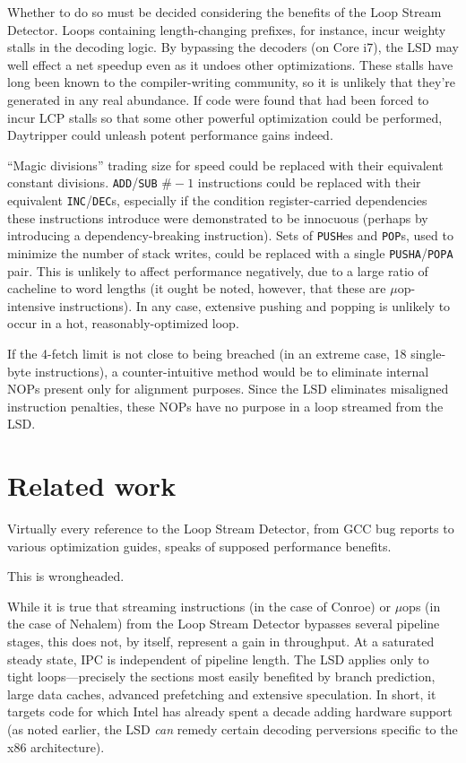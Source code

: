 \documentclass[]{sigplanconf}
\begin{document}
Whether to do so must be decided considering the benefits of the Loop Stream
Detector. Loops containing length-changing prefixes, for instance, incur weighty
stalls in the decoding logic. By bypassing the decoders (on Core\texttrademark
i7), the LSD may well effect a net speedup even as it undoes other optimizations.
These stalls have long been known to the compiler-writing community, so it is
unlikely that they're generated in any real abundance. If code were found that
had been forced to incur LCP stalls so that some other powerful optimization
could be performed, Daytripper could unleash potent performance gains indeed.

``Magic divisions'' trading size for speed \cite{knuth2} could be replaced
with their equivalent constant divisions. \texttt{ADD}/\texttt{SUB} $\#-1$ instructions
could be replaced with their equivalent \texttt{INC}/\texttt{DEC}s, especially
if the condition register-carried dependencies these instructions introduce
were demonstrated to be innocuous (perhaps by introducing a dependency-breaking
instruction). Sets of \texttt{PUSH}es and \texttt{POP}s, used
to minimize the number of stack writes, could be replaced with a single
\texttt{PUSHA}/\texttt{POPA} pair. This is unlikely to affect performance negatively,
due to a large ratio of cacheline to word lengths (it ought be noted, however,
that these are $\mu$op-intensive instructions). In any case, extensive pushing
and popping is unlikely to occur in a hot, reasonably-optimized loop.

If the 4-fetch limit is not close to being breached (in an extreme case, 18
single-byte instructions), a counter-intuitive method would be to eliminate
internal NOPs present only for alignment purposes. Since the LSD eliminates
misaligned instruction penalties, these NOPs have no purpose in a loop
streamed from the LSD.
\section{Related work}
Virtually every reference to the Loop Stream Detector, from GCC bug reports
\cite{gcclsd} to various optimization guides, speaks of supposed performance benefits.

This is wrongheaded.

While it is true that streaming instructions (in the case of Conroe) or $\mu$ops
(in the case of Nehalem) from the Loop Stream Detector bypasses several pipeline stages,
this does not, by itself, represent a gain in throughput. At a saturated steady
state, IPC is independent of pipeline length. The LSD applies only to tight
loops---precisely the sections most easily benefited by branch prediction,
large data caches, advanced prefetching and extensive speculation. In short,
it targets code for which Intel has already spent a decade adding hardware
support (as noted earlier, the LSD \textit{can} remedy certain decoding
perversions specific to the x86 architecture).
\end{document}
